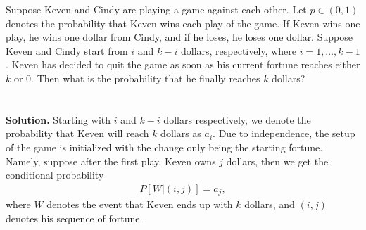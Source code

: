 Suppose Keven and Cindy are playing a game against each other. Let $p\in (0, 1)$ denotes the probability that Keven wins each play of the game. If Keven wins one play, he wins one dollar from Cindy, and if he loses, he loses one dollar. Suppose Keven and Cindy start from $i$ and $k-i$ dollars, respectively, where $i = 1, \ldots, k-1$. Keven has decided to quit the game as soon as his current fortune reaches either $k$ or 0. Then what is the probability that he finally reaches $k$ dollars?\\
~\\
~\\
\textbf{Solution.} Starting with $i$ and $k-i$ dollars respectively, we denote the probability that Keven will reach $k$ dollars as $a_i$. Due to independence, the setup of the game is initialized with the change only being the starting fortune. Namely, suppose after the first play, Keven owns $j$ dollars, then we get the conditional probability
\begin{align*}
P[W|(i, j)] = a_j,
\end{align*}
where $W$ denotes the event that Keven ends up with $k$ dollars, and $(i, j)$ denotes his sequence of fortune. 

